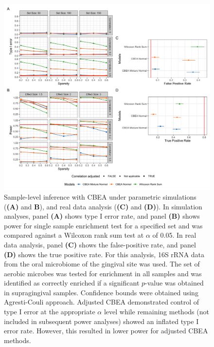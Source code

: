 \begin{figure}[!h]
    \centering
    \includegraphics[width=\textwidth]{figures/sim_data_ss_hypo.png}
    \caption{Sample-level inference with CBEA under parametric simulations (\textbf{(A)} and \textbf{B}), and real data analysis (\textbf{(C)} and \textbf{(D)}). In simulation analyses, panel \textbf{(A)} shows type I error rate, and panel \textbf{(B)} shows power for single sample enrichment test for a specified set and was compared against a Wilcoxon rank sum test at $\alpha$ of 0.05. In real data analysis, panel \textbf{(C)} shows the false-positive rate, and panel \textbf{(D)} shows the true positive rate. For this analysis, 16S rRNA data from the oral microbiome of the gingival site was used. The set of aerobic microbes was tested for enrichment in all samples and was identified as correctly enriched if a significant $p$-value was obtained in supragingival samples. Confidence bounds were obtained using Agresti-Couli \cite{agresti1998} approach. Adjusted CBEA demonstrated control of type I error at the appropriate $\alpha$ level while remaining methods (not included in subsequent power analyses) showed an inflated type I error rate. However, this resulted in lower power for adjusted CBEA methods.}
    \label{fig:2}
\end{figure}

